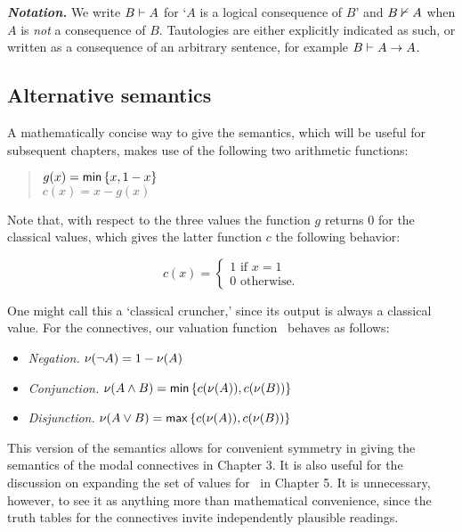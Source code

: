 \textbf{\emph{Notation.}} We write ${B}\vdash{A}$ for `$A$ is a logical consequence of $B$' and ${B}\nvdash{A}$ when $A$ is \emph{not} a consequence of $B$. Tautologies are either explicitly indicated as such, or written as a consequence of an arbitrary sentence, for example ${B}\vdash{A\ensuremath{\rightarrow}A}$. 

\subsection{Alternative semantics}\label{alternativeSemantics}

A mathematically concise way to give the semantics, which will be useful for subsequent chapters, makes use of the following two arithmetic functions:

\begin{quote} 
		$g(x) = \mathsf{min}\left\{{ x, 1 - x }\right\}$ \\
		$c(x) = x - g(x)$ 
\end{quote} 
	
\noindent Note that, with respect to the three values  the function $g$ returns $0$ for the classical values, which gives the latter function $c$ the following behavior:  

\[c\left(x\right) = \begin{cases} 1 \mbox{ if } x=1 \\
			0 \mbox{ otherwise.}
		\end{cases}
\]     

\noindent One might call this a `classical cruncher,' since its output is always a classical value. For the connectives, our valuation function \MCnu\ behaves as follows:

\begin{itemize}
\item \emph{Negation.} $\mathcal{\nu}({\neg A}) = 1 - \mathcal{\nu}({A})$

\item \emph{Conjunction.} $\mathcal{\nu}({A\wedge B}) = \mathsf{min}\left\{{c(\mathcal{\nu}({A})), c(\mathcal{\nu}({B}))}\right\}$

\item \emph{Disjunction.} $\mathcal{\nu}({A\vee B}) = \mathsf{max}\left\{{c(\mathcal{\nu}({A})), c(\mathcal{\nu}({B}))}\right\}$
\end{itemize}

\noindent This version of the semantics allows for convenient symmetry in giving the semantics of the modal connectives in Chapter 3. It is also useful for the discussion on expanding the set of values for \GO\ in Chapter 5. It is unnecessary, however, to see it as anything more than mathematical convenience, since the truth tables for the connectives invite independently plausible readings.

